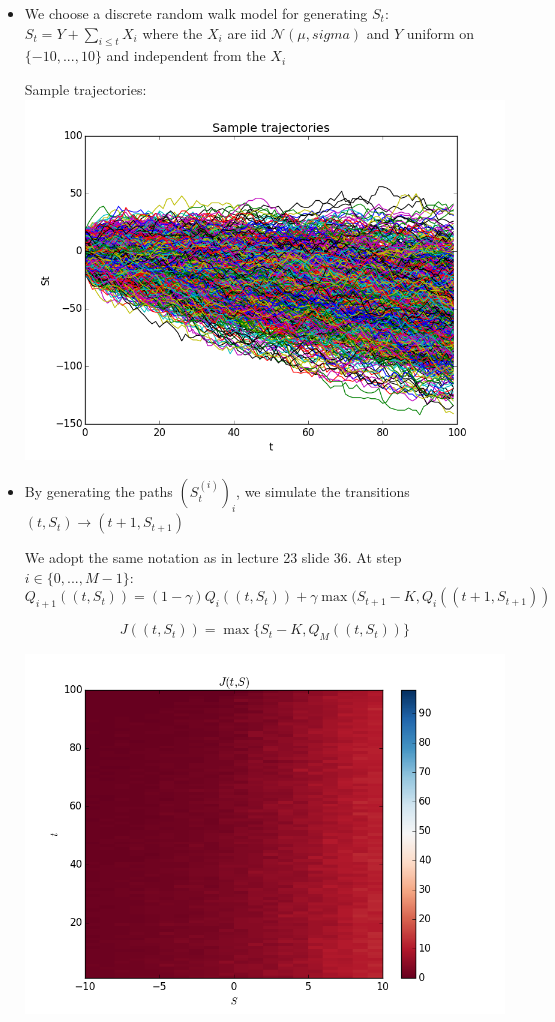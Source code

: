 \documentclass[12pt]{article}
\begin{document}
\begin{itemize}
\item
  We choose a discrete random walk model for generating $S_t$:
  $S_t = Y + \sum_{i \le t} X_i$ where
  the $X_i$ are iid $\mathcal{N}(\mu, sigma)$
  and $Y$ uniform on $\{-10, ..., 10\}$ and independent from the $X_i$

  Sample trajectories:
  \includegraphics[scale=1.]{traj.png}
  
\item 
  By generating the paths $(S_t^{(i)})_i$,
  we simulate the transitions $(t, S_t) \rightarrow (t+1, S_{t+1})$

    We adopt the same notation as in lecture 23 slide 36.
    At step $i \in \{0, ..., M-1\}$:
    $$Q_{i+1}((t, S_t)) =  (1-\gamma)Q_i((t, S_t)) + \gamma \max( S_{t+1} - K, Q_i((t+1, S_{t+1}))$$
    
    $$J((t, S_t)) = \max \{ S_t - K, Q_M((t, S_t)) \}$$

    
    \includegraphics[scale=1.]{option.png}
    

\end{itemize}
\end{document}
